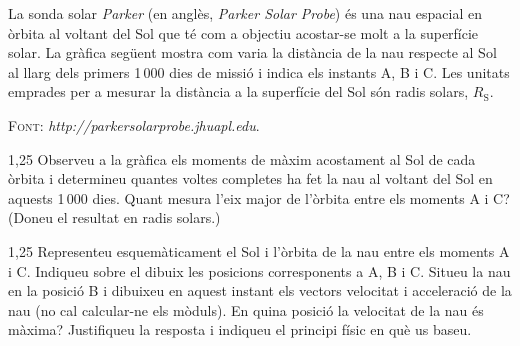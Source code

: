 La sonda solar \textit{Parker} (en anglès, \textit{Parker Solar Probe}) és una nau espacial en òrbita al voltant del Sol que té com a objectiu acostar-se molt a la superfície solar. La gràfica següent mostra com varia la distància de la nau respecte al Sol al llarg dels primers 1\,000 dies de missió i indica els instants A, B i C. Les unitats emprades per a mesurar la distància a la superfície del Sol són radis solars, $R_\mathrm{S}$.

{\centering\small\textsc{Font:} \textit{http://parkersolarprobe.jhuapl.edu}.\par}

\begin{apartat}{1,25}
Observeu a la gràfica els moments de màxim acostament al Sol de cada òrbita i determineu quantes voltes completes ha fet la nau al voltant del Sol en aquests 1\,000 dies. Quant mesura l'eix major de l'òrbita entre els moments A i C? (Doneu el resultat en radis solars.)
\end{apartat}

\begin{apartat}{1,25}
Representeu esquemàticament el Sol i l'òrbita de la nau entre els moments A i C. Indiqueu sobre el dibuix les posicions corresponents a A, B i C. Situeu la nau en la posició B i dibuixeu en aquest instant els vectors velocitat i acceleració de la nau (no cal calcular-ne els mòduls). En quina posició la velocitat de la nau és màxima? Justifiqueu la resposta i indiqueu el principi físic en què us baseu.
\end{apartat}
